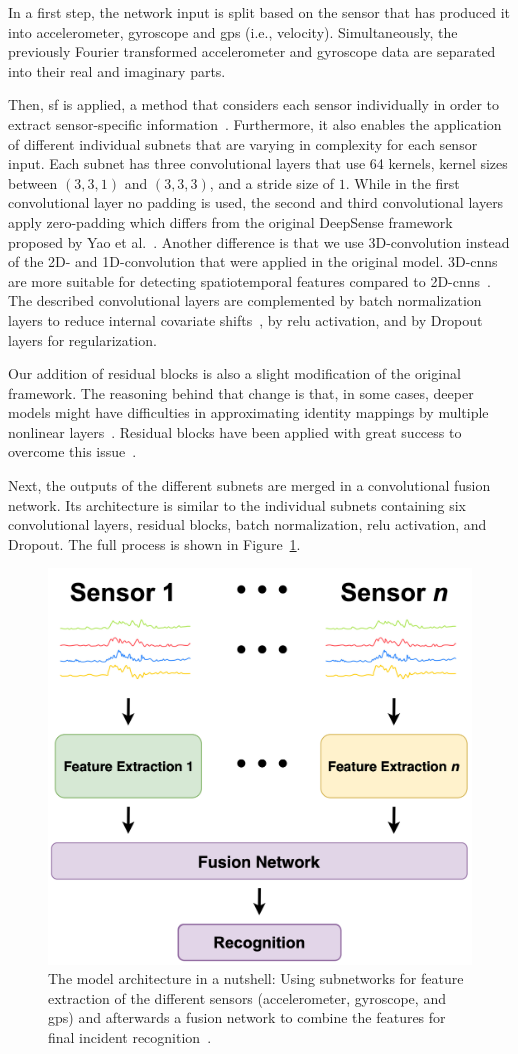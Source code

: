 In a first step, the network input is split based on the sensor that has produced it into accelerometer, gyroscope and \ac{gps} (i.e., velocity).
Simultaneously, the previously Fourier transformed accelerometer and gyroscope data are separated into their real and imaginary parts.

Then, \ac{sf} is applied, a method that considers each sensor individually in order to extract sensor-specific information~\cite{elmenreich2002sensor}.
Furthermore, it also enables the application of different individual subnets that are varying in complexity for each sensor input.
Each subnet has three convolutional layers that use 64 kernels, kernel sizes between $(3,3,1)$ and $(3,3,3)$, and a stride size of $1$.
While in the first convolutional layer no padding is used, the second and third convolutional layers apply zero-padding which differs from the original DeepSense framework proposed by Yao et al.~\cite{yao2017deepsense}.
Another difference is that we use 3D-convolution instead of the 2D- and 1D-convolution that were applied in the original model.
3D-\acp{cnn} are more suitable for detecting spatiotemporal features compared to 2D-\acp{cnn}~\cite{tran2015learning}.
The described convolutional layers are complemented by batch normalization layers to reduce internal covariate shifts~\cite{ioffe2015batch}, by \ac{relu} activation, and by Dropout layers for regularization.

Our addition of residual blocks is also a slight modification of the original framework.
The reasoning behind that change is that, in some cases, deeper models might have difficulties in approximating identity mappings by multiple nonlinear layers~\cite{he2016deep}.
Residual blocks have been applied with great success to overcome this issue~\cite{he2016deep}.

Next, the outputs of the different subnets are merged in a convolutional fusion network.
Its architecture is similar to the individual subnets containing six convolutional layers, residual blocks, batch normalization, \ac{relu} activation, and Dropout.
The full process is shown in Figure~\ref{fig:sfn}.

\begin{figure}%
\centering
    \includegraphics[width=0.4\columnwidth]{fig/sensor-and-fusion-networks.png}
    \caption{The model architecture in a nutshell: Using subnetworks for feature extraction of the different sensors (accelerometer, gyroscope, and \ac{gps}) and afterwards a fusion network to combine the features for final incident recognition~\cite{chen2021deep}.}
    \label{fig:sfn}
\end{figure}

